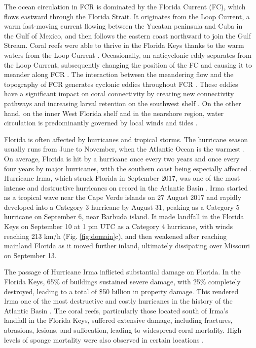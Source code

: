 \documentclass[fleqn,10pt]{wlscirep}
\newcommand{\modif}[1]{{#1}}
\begin{document}
The ocean circulation in FCR is dominated by the Florida Current (FC), which flows eastward through the Florida Strait. It originates from the Loop Current, a warm fast-moving current flowing between the Yucatan peninsula and Cuba in the Gulf of Mexico, and then follows the eastern coast northward to join the Gulf Stream. Coral reefs were able to thrive in the Florida Keys thanks to the warm waters from the Loop Current \citep{Donahue2008Jan}. Occasionally, an anticyclonic eddy separates from the Loop Current, subsequently changing the position of the FC and causing it to meander along FCR \citep{Leipper1970Jan,Vukovich1988Dec}. The interaction between the meandering flow and the topography of FCR generates cyclonic eddies throughout FCR \citep{Kourafalou2012May}. These eddies have a significant impact on coral connectivity \modif{by creating new connectivity pathways \citep{Limouzy-Paris1997Jul} and increasing larval retention on the southwest shelf \citep{Lee1994May}}. On the other hand, on the inner West Florida shelf and  in the nearshore region, water circulation is predominantly governed by local winds and tides \citep{Lee2002Jun,Sponaugle2007Feb}.

Florida is often affected by hurricanes and tropical storms. The hurricane season usually runs from June to November, when the Atlantic Ocean is the warmest \citep{Neumann1999}. On average, Florida is hit by a hurricane once every two years and once every four years by major hurricanes, with the southern coast being especially affected \citep{Malmstadt2009Jan,IFAS2021Aug}. Hurricane Irma, which struck Florida in September 2017, was one of the most intense and destructive hurricanes on record in the Atlantic Basin \citep{Cangialosi2018,Xian2018Jul}. Irma started as a tropical wave near the Cape Verde islands on 27 August 2017 and rapidly developed into a Category 3 hurricane by August 31, peaking as a Category 5 hurricane on September 6, near Barbuda island. It made landfall in the Florida Keys on September 10 at 1 pm UTC as a Category 4 hurricane, with winds reaching 213 km/h (Fig. \ref{fig:domain}c), and then weakened after reaching mainland Florida as it moved further inland, ultimately dissipating over Missouri on September 13.

The passage of Hurricane Irma inflicted substantial damage on Florida. In the Florida Keys, 65\% of buildings sustained severe damage, with 25\% completely destroyed, leading to a total of \$50 billion in property damage. This rendered Irma one of the most destructive and costly hurricanes in the history of the Atlantic Basin \citep{Cangialosi2018,NOAAcost}. The coral reefs, particularly those located south of Irma's landfall in the Florida Keys, suffered extensive damage, including fractures, abrasions, lesions, and suffocation, leading to widespread coral mortality. High levels of sponge mortality were also observed in certain locations \citep{NOAAirma2022Aug}. %
\end{document}
